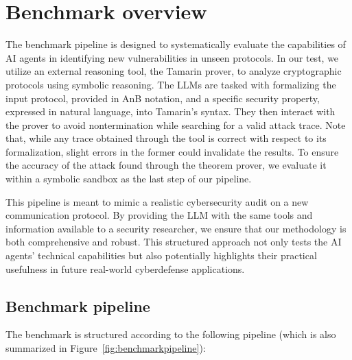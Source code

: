 

\section{Benchmark overview}
\label{sec:benchmarkpipeline}
The benchmark pipeline is designed to systematically evaluate the capabilities of AI agents in identifying new vulnerabilities in unseen protocols. In our test, we utilize an external reasoning tool, the Tamarin prover, to analyze cryptographic protocols using symbolic reasoning. The LLMs are tasked with formalizing the input protocol, provided in AnB notation, and a specific security property, expressed in natural language, into Tamarin's syntax. They then interact with the prover to avoid nontermination while searching for a valid attack trace. Note that, while any trace obtained through the tool is correct with respect to its formalization, slight errors in the former could invalidate the results. To ensure the accuracy of the attack found through the theorem prover, we evaluate it within a symbolic sandbox as the last step of our pipeline.

This pipeline is meant to mimic a realistic cybersecurity audit on a new communication protocol. By providing the LLM with the same tools and information available to a security researcher, we ensure that our methodology is both comprehensive and robust. This structured approach not only tests the AI agents' technical capabilities but also potentially highlights their practical usefulness in future real-world cyberdefense applications.

\subsection{Benchmark pipeline}
The benchmark is structured according to the following pipeline (which is also summarized in Figure~\ref{fig:benchmarkpipeline}):

